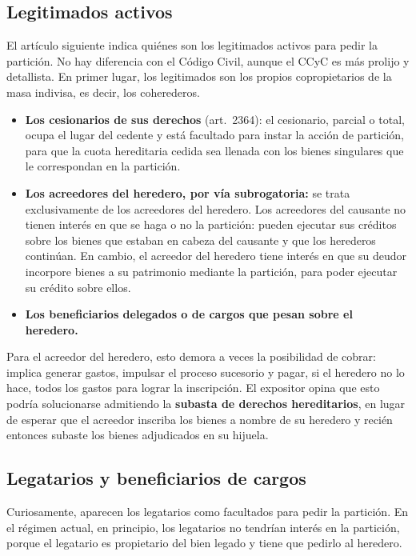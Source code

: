 \documentclass[12pt,oneside]{book}
\begin{document}
\subsection{Legitimados activos}

El artículo siguiente indica quiénes son los legitimados activos para pedir la partición. No hay diferencia con el Código Civil, aunque el CCyC es más prolijo y detallista. En primer lugar, los legitimados son los propios copropietarios de la masa indivisa, es decir, los coherederos.

\begin{itemize}
    \item \textbf{Los cesionarios de sus derechos} (art.~2364): el cesionario, parcial o total, ocupa el lugar del cedente y está facultado para instar la acción de partición, para que la cuota hereditaria cedida sea llenada con los bienes singulares que le correspondan en la partición.
    \item \textbf{Los acreedores del heredero, por vía subrogatoria:} se trata exclusivamente de los acreedores del heredero. Los acreedores del causante no tienen interés en que se haga o no la partición: pueden ejecutar sus créditos sobre los bienes que estaban en cabeza del causante y que los herederos continúan. En cambio, el acreedor del heredero tiene interés en que su deudor incorpore bienes a su patrimonio mediante la partición, para poder ejecutar su crédito sobre ellos.
    \item \textbf{Los beneficiarios delegados o de cargos que pesan sobre el heredero.}
\end{itemize}

Para el acreedor del heredero, esto demora a veces la posibilidad de cobrar: implica generar gastos, impulsar el proceso sucesorio y pagar, si el heredero no lo hace, todos los gastos para lograr la inscripción. El expositor opina que esto podría solucionarse admitiendo la \textbf{subasta de derechos hereditarios}, en lugar de esperar que el acreedor inscriba los bienes a nombre de su heredero y recién entonces subaste los bienes adjudicados en su hijuela.

\subsection{Legatarios y beneficiarios de cargos}

Curiosamente, aparecen los legatarios como facultados para pedir la partición. En el régimen actual, en principio, los legatarios no tendrían interés en la partición, porque el legatario es propietario del bien legado y tiene que pedirlo al heredero.
\end{document}
